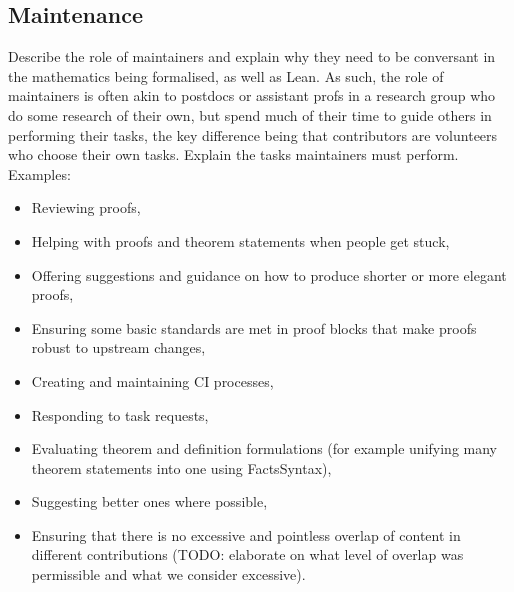 \subsection{Maintenance}

Describe the role of maintainers and explain why they need to be conversant in the mathematics being formalised, as well as Lean. As such, the role of maintainers is often akin to postdocs or assistant profs in a research group who do some research of their own, but spend much of their time to guide others in performing their tasks, the key difference being that contributors are volunteers who choose their own tasks. Explain the tasks maintainers must perform. Examples:

\begin{itemize}
    \item Reviewing proofs,
    \item Helping with proofs and theorem statements when people get stuck,
    \item Offering suggestions and guidance on how to produce shorter or more elegant proofs,
    \item Ensuring some basic standards are met in proof blocks that make proofs robust to upstream changes,
    \item Creating and maintaining CI processes,
    \item Responding to task requests,
    \item Evaluating theorem and definition formulations (for example unifying many theorem statements into one using FactsSyntax),
    \item Suggesting better ones where possible,
    \item Ensuring that there is no excessive and pointless overlap of content in different contributions (TODO: elaborate on what level of overlap was permissible and what we consider excessive).
\end{itemize}

